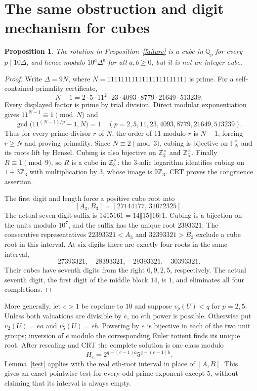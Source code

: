 \documentclass[9pt]{extarticle}
\newtheorem{proposition}[theorem]{Proposition}
\begin{document}
\section{The same obstruction and digit mechanism for cubes}
\begin{proposition}\label{cubes}
The rotation in Proposition~\ref{failure} is a cube in $\mathbb Q_p$
for every $p\mid10\Delta$, and hence modulo $10^a\Delta^b$ for all
$a,b\ge0$, but it is not an integer cube.
\end{proposition}
\begin{proof}
Write $\Delta=9N$, where $N=11111111111111111111111$ is prime.
For a self-contained primality certificate,
\[
 N-1=2\cdot5\cdot11^2\cdot23\cdot4093\cdot8779\cdot21649\cdot513239.
\]
Every displayed factor is prime by trial division. Direct modular
exponentiation gives $11^{N-1}\equiv1\pmod N$ and
\[
 \gcd\bigl(11^{(N-1)/p}-1,N\bigr)=1
 \quad(p=2,5,11,23,4093,8779,21649,513239).
\]
Thus for every prime divisor $r$ of $N$, the order of $11$ modulo $r$
is $N-1$, forcing $r\ge N$ and proving primality. Since $N\equiv2\pmod3$,
cubing is bijective on $\mathbb F_N^\times$ and its roots lift by Hensel.
Cubing is also bijective on $\mathbb Z_2^\times$ and
$\mathbb Z_5^\times$. Finally $R\equiv1\pmod9$, so $R$ is a cube in
$\mathbb Z_3^\times$: the $3$-adic logarithm identifies cubing on
$1+3\mathbb Z_3$ with multiplication by $3$, whose image is
$9\mathbb Z_3$. CRT proves the congruence assertion.

The first digit and length force a positive cube root into
\[
 [A_3,B_3]=[27144177,\,31072325].
\]
The actual seven-digit suffix is $1415161=14\Vert15\Vert16\Vert1$.
Cubing is a bijection on the units modulo $10^7$, and the suffix has
the unique root $2393321$.
The consecutive representatives $22393321<A_3$ and $32393321>B_3$
exclude a cube root in this interval. At six digits there are exactly
four roots in the same interval,
\[
 27393321,\quad28393321,\quad29393321,\quad30393321.
\]
Their cubes have seventh digits from the right $6,9,2,5$, respectively.
The actual seventh digit, the first digit of the middle block $14$,
is $1$, and eliminates all four completions.
\end{proof}

More generally, let $e>1$ be coprime to $10$ and suppose $v_p(U)<q$
for $p=2,5$. Unless both valuations are divisible by $e$, no $e$th
power is possible. Otherwise put $v_2(U)=ea$ and $v_5(U)=eb$.
Powering by $e$ is bijective in each of the two unit groups; inversion
of $e$ modulo the corresponding Euler totient finds its unique root.
After rescaling and CRT the complete solution is one class modulo
\[
 H_e=2^{q-(e-1)a}5^{q-(e-1)b}.
\]
Lemma~\ref{test} applies with the real $e$th-root interval in place of
$[A,B]$. This gives an exact pointwise test for every odd prime exponent
except $5$, without claiming that its interval is always empty.
\end{document}
